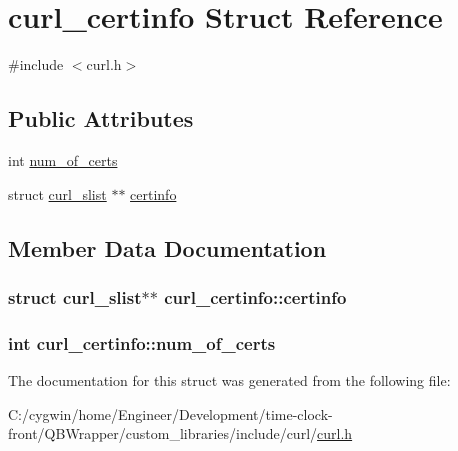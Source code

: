 \hypertarget{structcurl__certinfo}{}\section{curl\+\_\+certinfo Struct Reference}
\label{structcurl__certinfo}


{\ttfamily \#include $<$curl.\+h$>$}

\subsection*{Public Attributes}
\begin{DoxyCompactItemize}
\item 
int \hyperlink{structcurl__certinfo_a9eb8ef837e5a8ddb848ac7bae35ed92f}{num\+\_\+of\+\_\+certs}
\item 
struct \hyperlink{structcurl__slist}{curl\+\_\+slist} $\ast$$\ast$ \hyperlink{structcurl__certinfo_abf4b9471e37ce9659080f329a64b1bab}{certinfo}
\end{DoxyCompactItemize}


\subsection{Member Data Documentation}
\hypertarget{structcurl__certinfo_abf4b9471e37ce9659080f329a64b1bab}{}
\subsubsection[{certinfo}]{\setlength{\rightskip}{0pt plus 5cm}struct {\bf curl\+\_\+slist}$\ast$$\ast$ curl\+\_\+certinfo\+::certinfo}\label{structcurl__certinfo_abf4b9471e37ce9659080f329a64b1bab}
\hypertarget{structcurl__certinfo_a9eb8ef837e5a8ddb848ac7bae35ed92f}{}
\subsubsection[{num\+\_\+of\+\_\+certs}]{\setlength{\rightskip}{0pt plus 5cm}int curl\+\_\+certinfo\+::num\+\_\+of\+\_\+certs}\label{structcurl__certinfo_a9eb8ef837e5a8ddb848ac7bae35ed92f}


The documentation for this struct was generated from the following file\+:\begin{DoxyCompactItemize}
\item 
C\+:/cygwin/home/\+Engineer/\+Development/time-\/clock-\/front/\+Q\+B\+Wrapper/custom\+\_\+libraries/include/curl/\hyperlink{curl_8h}{curl.\+h}\end{DoxyCompactItemize}
